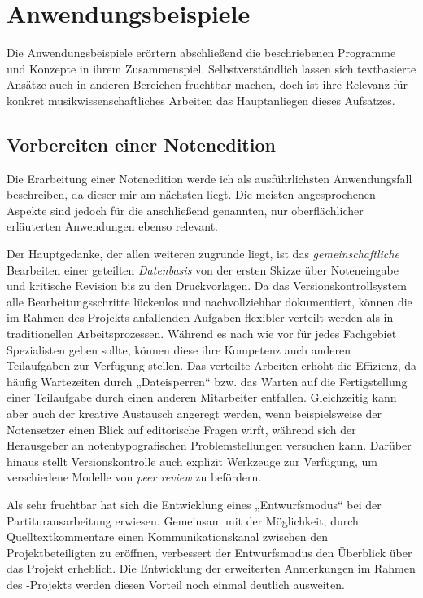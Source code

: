 \documentclass[DIV=12]{scrreprt}
\begin{document}
\chapter{Anwendungsbeispiele}
\label{chap:pt_applications}

Die Anwendungsbeispiele erörtern abschließend die beschriebenen Programme und Konzepte in ihrem Zusammenspiel.
Selbstverständlich lassen sich textbasierte Ansätze auch in anderen Bereichen fruchtbar machen, doch ist ihre Relevanz für konkret musikwissenschaftliches Arbeiten das Hauptanliegen dieses Aufsatzes.

\section{Vorbereiten einer Notenedition}
\label{sec:pt_preparing-edition}
Die Erarbeitung einer Notenedition werde ich als ausführlichsten Anwendungsfall beschreiben, da dieser mir am nächsten liegt.
Die meisten angesprochenen Aspekte sind jedoch für die anschließend genannten, nur oberflächlicher erläuterten Anwendungen ebenso relevant.

\medskip
 
Der Hauptgedanke, der allen weiteren zugrunde liegt, ist das \emph{gemeinschaftliche} Bearbeiten einer geteilten \emph{Datenbasis} von der ersten Skizze über Noteneingabe und kritische Revision bis zu den Druckvorlagen.
Da das Versionskontrollsystem alle Bearbeitungsschritte lückenlos und nachvollziehbar dokumentiert, können die im Rahmen des Projekts anfallenden Aufgaben flexibler verteilt werden als in traditionellen Arbeitsprozessen.
Während es nach wie vor für jedes Fachgebiet Spezialisten geben sollte, können diese ihre Kompetenz auch anderen Teilaufgaben zur Verfügung stellen.
Das verteilte Arbeiten erhöht die Effizienz, da häufig Wartezeiten durch „Dateisperren“ bzw. das Warten auf die Fertigstellung einer Teilaufgabe durch einen anderen Mitarbeiter entfallen.
Gleichzeitig kann aber auch der kreative Austausch angeregt werden, wenn beispielsweise der Notensetzer einen Blick auf editorische Fragen wirft, während sich der Herausgeber an notentypografischen Problemstellungen versuchen kann.
Darüber hinaus stellt Versionskontrolle auch explizit Werkzeuge zur Verfügung, um verschiedene Modelle von \emph{peer review} zu befördern.

Als sehr fruchtbar hat sich die Entwicklung eines „Entwurfsmodus“ bei der Partiturausarbeitung erwiesen.
Gemeinsam mit der Möglichkeit, durch Quelltextkommentare einen Kommunikationskanal zwischen den Projektbeteiligten zu eröffnen, verbessert der Entwurfsmodus den Überblick über das Projekt erheblich.
Die Entwicklung der erweiterten Anmerkungen im Rahmen des -Projekts werden diesen Vorteil noch einmal deutlich ausweiten.
\end{document}
